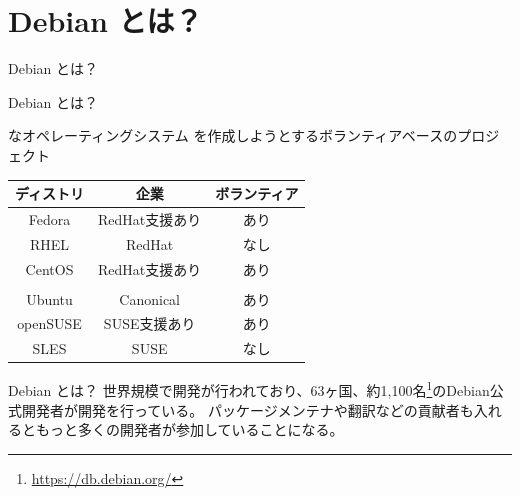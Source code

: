 \section{Debian とは？}

\begin{frame}\begin{center}\Huge{Debian とは？}\end{center}\end{frame}


\begin{frame}{Debian とは？}

{\color{red}{フリー/オープン}}な{\color{red}{ユニバーサル}}オペレーティングシステム を作成しようとするボランティアベースのプロジェクト

\begin{table}[htb]
  \begin{tabular}{|c|c|c|}
    \hline
    ディストリ & 企業 & ボランティア \\ \hline
    Fedora & RedHat支援あり & あり  \\ \hline
    RHEL & RedHat & なし  \\ \hline
    CentOS & RedHat支援あり & あり \\ \hline
    \color{red}{Debian}  & \color{red}{なし} & \color{red}{あり} \\ \hline
    Ubuntu  & Canonical & あり \\ \hline
    openSUSE & SUSE支援あり & あり \\ \hline
    SLES & SUSE & なし \\ \hline
  \end{tabular}
\end{table}

\end{frame}

\begin{frame}{Debian とは？}
  世界規模で開発が行われており、63ヶ国、約1,100名\footnote{\url{https://db.debian.org/}}のDebian公式開発者が開発を行っている。
  パッケージメンテナや翻訳などの貢献者も入れるともっと多くの開発者が参加していることになる。
 \begin{center}
 \end{center}
\end{frame}


